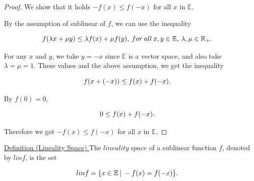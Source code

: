 \documentclass[a4paper,11pt]{jsarticle}
\begin{document}
\begin{proof}
  We show that it holds $-f(x) \leq f(-x)$ for all $x$ in $\mathbb{E}$.

  By the assumption of sublinear of $f$, we can use the inequality

  \begin{equation}
    f(\lambda x + \mu y) \leq \lambda f(x) + \mu f(y),\:for \:all\: x, y \in{\mathbb{E}},\: \lambda, \mu \in{\mathbb{R}}_+. \notag
  \end{equation}

  For any $x$ and $y$, we take $y=-x$ since ${\mathbb{E}}$ is a vector space, and also take $\lambda=\mu=1$. These values and the above assumption, we get the inequality

  \begin{equation}
    f(x + (-x)) \leq f(x) + f(-x). \notag
  \end{equation}

  By $f(0) = 0$,

  \begin{equation}
    0 \leq f(x) + f(-x). \notag
  \end{equation}

  Therefore we got $-f(x) \leq f(-x)$ for all $x$ in $\mathbb{E}$.
\end{proof}

\begin{itembox}[l]{\underline{Definition (Lineality Space) }}
  The $lineality\:space$ of a
  sublinear function $f$, denoted by $lin f$, is the set

  \begin{equation}
    lin f = \{x \in \mathbb{E}\:|\:-f(x) = f(-x)\}. \notag
  \end{equation}
\end{itembox}
\end{document}
